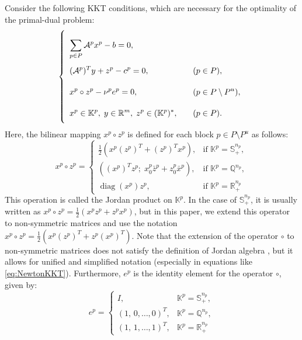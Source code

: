 \medskip

\noindent
Consider the following KKT conditions, which are necessary for the optimality of the primal-dual problem:
\begin{equation}
    \everymath{\displaystyle}
    \renewcommand{\arraystretch}{2.5}
    \left\{
    \begin{array}{ll}
        \sum_{p \in P} \mathcal{A}^p x^p - b = 0, & \\[-4pt]
        (\mathcal{A}^p)^T y + z^p - c^p = 0, & \quad (p \in P),\\[-4pt]
        x^p \circ z^p - \nu^p e^p = 0, & \quad (p \in P \setminus P^u),\\[-4pt]
        x^p \in \mathbb{K}^p,\; y \in \mathbb{R}^m,\; z^p \in (\mathbb{K}^p)^*, & \quad (p \in P).
    \end{array}
    \right.
    \label{eq:KKTcond}
\end{equation}
Here, the bilinear mapping $x^p \circ z^p$ is defined for each block $p \in P \setminus P^u$ as follows:
\[
  x^p \circ z^p = 
  \begin{cases}
    \frac{1}{2} \left( x^p (z^p)^T + (z^p)^T x^p \right), 
      & \text{if } \mathbb{K}^p = \mathbb{S}^{n_p}_+,\\[4pt]
    \left( (x^p)^T z^p;\; x^p_0 \bar{z}^p + z^p_0 \bar{x}^p \right),
      & \text{if } \mathbb{K}^p = \mathbb{Q}^{n_p},\\[4pt]
    \operatorname{diag}(x^p) z^p,
      & \text{if } \mathbb{K}^p = \mathbb{R}^{n_p}_+ %
  \end{cases}
\]
This operation is called the Jordan product on $\mathbb{K}^p$. In the case of $\mathbb{S}^{n_p}_+$, it is usually written as $x^p \circ z^p = \frac{1}{2}(x^p z^p + z^p x^p)$, but in this paper, we extend this operator to non-symmetric matrices and use the notation $x^p \circ z^p = \frac{1}{2} \left( x^p (z^p)^T + z^p (x^p)^T \right)$. Note that the extension of the operator $\circ$ to non-symmetric matrices does not satisfy the definition of Jordan algebra \cite{Faraut1994}, but it allows for unified and simplified notation (especially in equations like \eqref{eq:NewtonKKT}). Furthermore, $e^p$ is the identity element for the operator $\circ$, given by:
\[
  e^p = 
  \begin{cases}
    I, & \mathbb{K}^p = \mathbb{S}^{n_p}_+,\\[3pt]
    (1,\,0,\ldots,0)^T, & \mathbb{K}^p = \mathbb{Q}^{n_p},\\[3pt]
    (1,\,1,\ldots,1)^T, & \mathbb{K}^p = \mathbb{R}^{n_p}_+ %
  \end{cases}
\]

